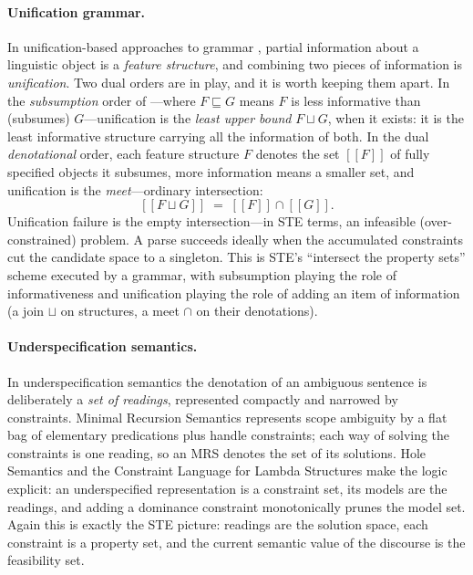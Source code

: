 \documentclass[11pt]{article}
\newcommand{\sem}[1]{[\![#1]\!]}
\begin{document}
\paragraph{Unification grammar.}
In unification-based approaches to grammar
\citep{shieber1986unification, carpenter1992logic}, partial information
about a linguistic object is a \emph{feature structure}, and combining
two pieces of information is \emph{unification}.  Two dual orders are
in play, and it is worth keeping them apart.  In the \emph{subsumption}
order of \citet{carpenter1992logic}---where $F \sqsubseteq G$ means $F$
is less informative than (subsumes) $G$---unification is the
\emph{least upper bound} $F \sqcup G$, when it exists: it is the least
informative structure carrying all the information of both.  In the
dual \emph{denotational} order, each feature structure $F$ denotes the
set $\sem{F}$ of fully specified objects it subsumes, more information
means a smaller set, and unification is the \emph{meet}---ordinary
intersection:
\[
\sem{F \sqcup G} \;=\; \sem{F} \cap \sem{G} .
\]
Unification failure is the empty intersection---in STE terms, an
infeasible (over-constrained) problem.  A parse succeeds ideally when
the accumulated constraints cut the candidate space to a singleton.
This is STE's ``intersect the property sets'' scheme executed by a
grammar, with subsumption playing the role of informativeness and
unification playing the role of adding an item of information (a join
$\sqcup$ on structures, a meet $\cap$ on their denotations).

\paragraph{Underspecification semantics.}
In underspecification semantics the denotation of an ambiguous sentence
is deliberately a \emph{set of readings}, represented compactly and
narrowed by constraints.  Minimal Recursion Semantics
\citep{copestake2005mrs} represents scope ambiguity by a flat bag of
elementary predications plus handle constraints; each way of solving
the constraints is one reading, so an MRS denotes the set of its
solutions.  Hole Semantics \citep{bos1996hole} and the Constraint
Language for Lambda Structures \citep{egg2001cls} make the logic
explicit: an underspecified representation is a constraint set, its
models are the readings, and adding a dominance constraint monotonically
prunes the model set.  Again this is exactly the STE picture: readings
are the solution space, each constraint is a property set, and the
current semantic value of the discourse is the feasibility set.
\end{document}
